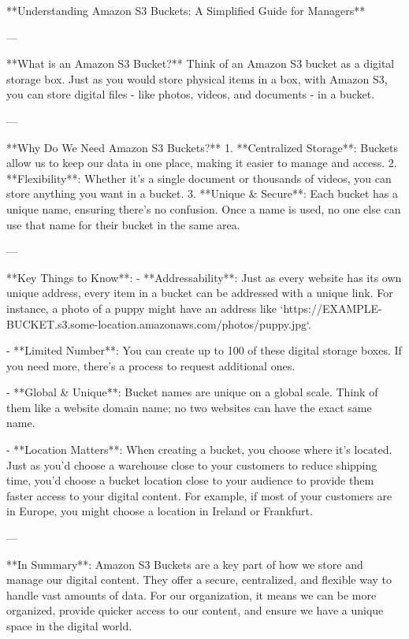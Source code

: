 **Understanding Amazon S3 Buckets: A Simplified Guide for Managers**

---

**What is an Amazon S3 Bucket?**  
Think of an Amazon S3 bucket as a digital storage box. Just as you would store physical items in a box, with Amazon S3, you can store digital files - like photos, videos, and documents - in a bucket.

---

**Why Do We Need Amazon S3 Buckets?**  
1. **Centralized Storage**: Buckets allow us to keep our data in one place, making it easier to manage and access.
2. **Flexibility**: Whether it's a single document or thousands of videos, you can store anything you want in a bucket.
3. **Unique & Secure**: Each bucket has a unique name, ensuring there's no confusion. Once a name is used, no one else can use that name for their bucket in the same area.

---

**Key Things to Know**:  
- **Addressability**: Just as every website has its own unique address, every item in a bucket can be addressed with a unique link. For instance, a photo of a puppy might have an address like `https://EXAMPLE-BUCKET.s3.some-location.amazonaws.com/photos/puppy.jpg`.
  
- **Limited Number**: You can create up to 100 of these digital storage boxes. If you need more, there's a process to request additional ones.
  
- **Global & Unique**: Bucket names are unique on a global scale. Think of them like a website domain name; no two websites can have the exact same name.

- **Location Matters**: When creating a bucket, you choose where it's located. Just as you'd choose a warehouse close to your customers to reduce shipping time, you'd choose a bucket location close to your audience to provide them faster access to your digital content. For example, if most of your customers are in Europe, you might choose a location in Ireland or Frankfurt.

---

**In Summary**:  
Amazon S3 Buckets are a key part of how we store and manage our digital content. They offer a secure, centralized, and flexible way to handle vast amounts of data. For our organization, it means we can be more organized, provide quicker access to our content, and ensure we have a unique space in the digital world.